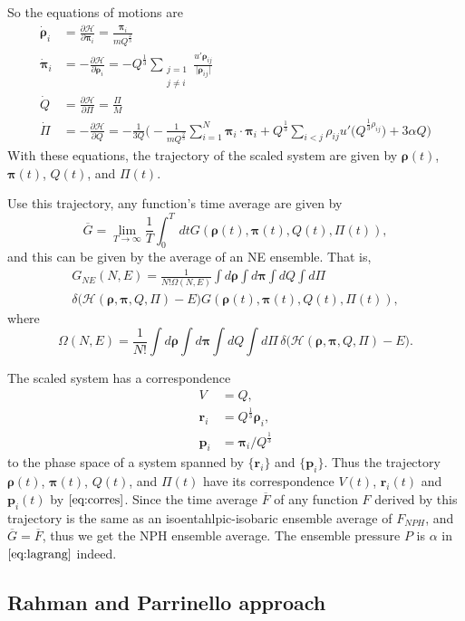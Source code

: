So the equations of motions are
\begin{align}
	\dot{ \bm{\rho} }_i & = \frac{ \partial \mathcal{H} }{ \partial \bm{\pi}_i } =
	\frac{ \bm{\pi}_i }{ m Q^{\frac{ 2 }{ 3 }} }\\
	\dot{ \bm{\pi} }_i  & = - \frac{ \partial \mathcal{H} }{ \partial \bm{\rho}_i } =
	- Q^{\frac{ 1 }{ 3 }} \sum_{\substack{j=1\\j\neq i}}
	\frac{ u' \bm{\rho}_{ij} }{ \lvert \bm{\rho}_{ij} \rvert  }\\
	\dot{ Q }           & = \frac{ \partial \mathcal{H} }{ \partial \Pi } =
	\frac{ \Pi }{ M } \\
	\dot{ \Pi }         & = - \frac{ \partial \mathcal{H} }{ \partial Q } =
	- \frac{ 1 }{ 3Q } \bigg(
	- \frac{ 1 }{ m Q^{\frac{ 2 }{ 3 }} }	\sum_{i=1}^{N} \bm{\pi}_i \cdot \bm{\pi}_i
	+ Q^{\frac{ 1 }{ 3 }} \sum_{i<j} \rho_{ij} u'\big(Q^{\frac{ 1 }{ 3 } \rho_{ij}}\big) +
	3 \alpha Q
	\bigg)
\end{align}
With these equations, the trajectory of the scaled system are given by
$\bm{\rho}(t)$, $\bm{\pi}(t)$, $Q(t)$, and $\Pi(t)$.

Use this trajectory, any function's time average are given by
\begin{equation}
	\overline{G} = \lim_{T \rightarrow \infty} \frac{ 1 }{ T } \int_{0}^{T}  \, dt
	G(\bm{\rho}(t), \bm{\pi}(t), Q(t), \Pi(t)),
\end{equation}
and this can be given by the average of an NE ensemble. That is,
\begin{multline}
	G_{NE} (N, E) = \frac{ 1 }{ N! \Omega(N,E) } \int d\bm{\rho} \int d\bm{\pi}
	\int dQ \int d\Pi \\
	\delta \big( \mathcal{H}(\bm{\rho}, \bm{\pi}, Q, \Pi)
	- E \big) G(\bm{\rho}(t), \bm{\pi}(t), Q(t), \Pi(t)),
\end{multline}
where
\begin{equation}
	\Omega(N, E) = \frac{ 1 }{ N! }  \int d\bm{\rho} \int d\bm{\pi}
	\int dQ \int d\Pi \, \delta \big( \mathcal{H}(\bm{\rho}, \bm{\pi}, Q, \Pi)
	- E \big).
\end{equation}

The scaled system has a correspondence
\begin{align}\label{eq:corres}
	V        & = Q,                               \\
	\bm{r}_i & = Q^{\frac{ 1 }{ 3 }} \bm{\rho}_i, \\
	\bm{p}_i & = \bm{\pi}_i / Q^{\frac{ 1 }{ 3 }}
\end{align}
to the phase space of a system spanned by $\{ \bm{r}_i \}$ and
$\{ \bm{p}_i \}$. Thus the trajectory
$\bm{\rho}(t)$, $\bm{\pi}(t)$, $Q(t)$, and $\Pi(t)$ have its
correspondence $V(t)$, $\bm{r}_i(t)$ and $\bm{p}_i(t)$ by
$\eqref{eq:corres}$.
Since the time average $\overline{F}$ of any function $F$
derived by this trajectory is the same as an
isoentahlpic-isobaric ensemble average of $F_{NPH}$, and
$\overline{G} = \overline{F}$, thus we get the NPH ensemble average.
The ensemble pressure $P$ is $\alpha$ in $\eqref{eq:lagrang}$ indeed.


\subsection{Rahman and Parrinello approach}


